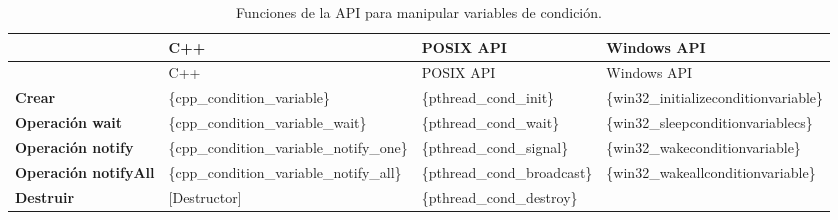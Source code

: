 \begin{longtable}[]{@{}
  >{\raggedright\arraybackslash}p{}
  >{\raggedright\arraybackslash}p{}
  >{\raggedright\arraybackslash}p{}
  >{\raggedright\arraybackslash}p{}@{}}
\caption{Funciones de la API para manipular variables de
condición.}\tabularnewline
\toprule\noalign{}
\begin{minipage}[b]{\linewidth}\raggedright
\end{minipage} & \begin{minipage}[b]{\linewidth}\raggedright
C++
\end{minipage} & \begin{minipage}[b]{\linewidth}\raggedright
POSIX API
\end{minipage} & \begin{minipage}[b]{\linewidth}\raggedright
Windows API
\end{minipage} \\
\midrule\noalign{}
\endfirsthead
\toprule\noalign{}
\begin{minipage}[b]{\linewidth}\raggedright
\end{minipage} & \begin{minipage}[b]{\linewidth}\raggedright
C++
\end{minipage} & \begin{minipage}[b]{\linewidth}\raggedright
POSIX API
\end{minipage} & \begin{minipage}[b]{\linewidth}\raggedright
Windows API
\end{minipage} \\
\midrule\noalign{}
\endhead
\bottomrule\noalign{}
\endlastfoot
\textbf{Crear} & \{cpp\_condition\_variable\} & \{pthread\_cond\_init\}
& \{win32\_initializeconditionvariable\} \\
\textbf{Operación wait} & \{cpp\_condition\_variable\_wait\} &
\{pthread\_cond\_wait\} & \{win32\_sleepconditionvariablecs\} \\
\textbf{Operación notify} & \{cpp\_condition\_variable\_notify\_one\} &
\{pthread\_cond\_signal\} & \{win32\_wakeconditionvariable\} \\
\textbf{Operación notifyAll} & \{cpp\_condition\_variable\_notify\_all\}
& \{pthread\_cond\_broadcast\} & \{win32\_wakeallconditionvariable\} \\
\textbf{Destruir} & {{[}Destructor{]}} & \{pthread\_cond\_destroy\} & \\
\end{longtable}

